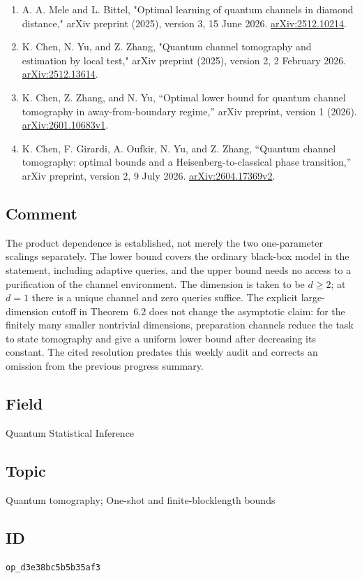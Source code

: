 \begin{enumerate}[label={},leftmargin=4.8em,labelsep=0.5em]
  \footnotesize
  \item[\textup{[Mele25]}]\label{ref:d3e3-mele25}
  A. A. Mele and L. Bittel, "Optimal learning of quantum channels in diamond distance," arXiv preprint (2025), version 3, 15 June 2026. \href{https://arxiv.org/abs/2512.10214}{arXiv:2512.10214}.

  \item[\textup{[Chen25]}]\label{ref:d3e3-chen25}
  K. Chen, N. Yu, and Z. Zhang, "Quantum channel tomography and estimation by local test," arXiv preprint (2025), version 2, 2 February 2026. \href{https://arxiv.org/abs/2512.13614}{arXiv:2512.13614}.

  \item[\textup{[CZY26]}]\label{ref:d3e3-czy26}
  K. Chen, Z. Zhang, and N. Yu, ``Optimal lower bound for quantum channel tomography in away-from-boundary regime,'' arXiv preprint, version 1 (2026). \href{https://arxiv.org/abs/2601.10683v1}{arXiv:2601.10683v1}.

  \item[\textup{[CGOYZ26]}]\label{ref:d3e3-cgoyz26}
  K. Chen, F. Girardi, A. Oufkir, N. Yu, and Z. Zhang, ``Quantum channel tomography: optimal bounds and a Heisenberg-to-classical phase transition,'' arXiv preprint, version 2, 9 July 2026. \href{https://arxiv.org/abs/2604.17369v2}{arXiv:2604.17369v2}.
\end{enumerate}

\subsection*{Comment}

The product dependence is established, not merely the two one-parameter scalings separately. The lower bound covers the ordinary black-box model in the statement, including adaptive queries, and the upper bound needs no access to a purification of the channel environment. The dimension is taken to be $d\geq2$; at $d=1$ there is a unique channel and zero queries suffice. The explicit large-dimension cutoff in Theorem~6.2 does not change the asymptotic claim: for the finitely many smaller nontrivial dimensions, preparation channels reduce the task to state tomography and give a uniform lower bound after decreasing its constant. The cited resolution predates this weekly audit and corrects an omission from the previous progress summary.

\subsection*{Field}

Quantum Statistical Inference

\subsection*{Topic}

Quantum tomography; One-shot and finite-blocklength bounds

\subsection*{ID}

\texttt{op\_d3e38bc5b5b35af3}
